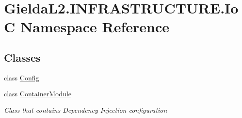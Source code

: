 \hypertarget{namespace_gielda_l2_1_1_i_n_f_r_a_s_t_r_u_c_t_u_r_e_1_1_io_c}{}\section{Gielda\+L2.\+I\+N\+F\+R\+A\+S\+T\+R\+U\+C\+T\+U\+R\+E.\+IoC Namespace Reference}
\label{namespace_gielda_l2_1_1_i_n_f_r_a_s_t_r_u_c_t_u_r_e_1_1_io_c}
\subsection*{Classes}
\begin{DoxyCompactItemize}
\item 
class \mbox{\hyperlink{class_gielda_l2_1_1_i_n_f_r_a_s_t_r_u_c_t_u_r_e_1_1_io_c_1_1_config}{Config}}
\item 
class \mbox{\hyperlink{class_gielda_l2_1_1_i_n_f_r_a_s_t_r_u_c_t_u_r_e_1_1_io_c_1_1_container_module}{Container\+Module}}
\begin{DoxyCompactList}\small\item\em Class that contains Dependency Injection configuration \end{DoxyCompactList}\end{DoxyCompactItemize}
